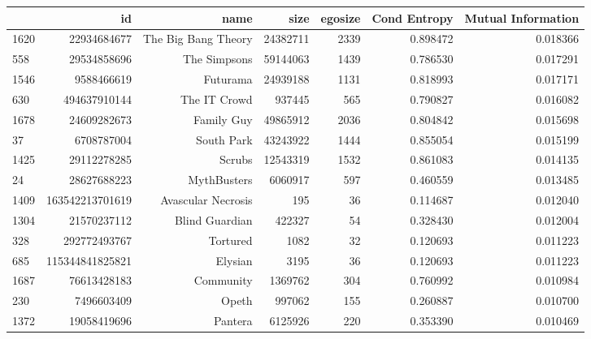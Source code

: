 \begin{table}
\begin{tabular}{| >{\small}l | >{\small}r | >{\small}r | >{\small}r | >{\small}r | >{\small}r |>{\small}r |}
\hline
{} &               id &                 name &      size &  egosize &  Cond Entropy &  Mutual Information \\
\hline
1620 &      22934684677 &  The Big Bang Theory &  24382711 &     2339 &             0.898472 &            0.018366 \\
558  &      29534858696 &         The Simpsons &  59144063 &     1439 &             0.786530 &            0.017291 \\
1546 &       9588466619 &             Futurama &  24939188 &     1131 &             0.818993 &            0.017171 \\
630  &     494637910144 &         The IT Crowd &    937445 &      565 &             0.790827 &            0.016082 \\
1678 &      24609282673 &           Family Guy &  49865912 &     2036 &             0.804842 &            0.015698 \\
37   &       6708787004 &           South Park &  43243922 &     1444 &             0.855054 &            0.015199 \\
1425 &      29112278285 &               Scrubs &  12543319 &     1532 &             0.861083 &            0.014135 \\
24   &      28627688223 &          MythBusters &   6060917 &      597 &             0.460559 &            0.013485 \\
1409 &  163542213701619 &   Avascular Necrosis &       195 &       36 &             0.114687 &            0.012040 \\
1304 &      21570237112 &       Blind Guardian &    422327 &       54 &             0.328430 &            0.012004 \\
328  &     292772493767 &             Tortured &      1082 &       32 &             0.120693 &            0.011223 \\
685  &  115344841825821 &              Elysian &      3195 &       36 &             0.120693 &            0.011223 \\
1687 &      76613428183 &            Community &   1369762 &      304 &             0.760992 &            0.010984 \\
230  &       7496603409 &                Opeth &    997062 &      155 &             0.260887 &            0.010700 \\
1372 &      19058419696 &              Pantera &   6125926 &      220 &             0.353390 &            0.010469 \\

\end{tabular}
\end{table}
